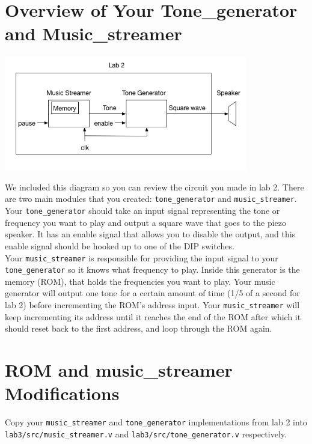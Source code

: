 \documentclass[11pt]{article}
\begin{document}
\section{Overview of Your Tone\_generator and Music\_streamer}

\begin{center}
\includegraphics[height=5cm]{images/lab2_fig1.png}
\end{center}

We included this diagram so you can review the circuit you made in lab 2. There are two main modules that you created: \verb|tone_generator| and \verb|music_streamer|. \\

Your \verb|tone_generator| should take an input signal representing the tone or frequency you want to play and output a square wave that goes to the piezo speaker. It has an enable signal that allows you to disable the output, and this enable signal should be hooked up to one of the DIP switches.  \\

Your \verb|music_streamer| is responsible for providing the input signal to your \verb|tone_generator| so it knows what frequency to play. Inside this generator is the memory (ROM), that holds the frequencies you want to play. Your music generator will output one tone for a certain amount of time (1/5 of a second for lab 2) before incrementing the ROM's address input. Your \verb|music_streamer| will keep incrementing its address until it reaches the end of the ROM after which it should reset back to the first address, and loop through the ROM again.

\section{ROM and music\_streamer Modifications}
Copy your \verb|music_streamer| and \verb|tone_generator| implementations from lab 2 into \verb|lab3/src/music_streamer.v| and \verb|lab3/src/tone_generator.v| respectively. 
\end{document}
